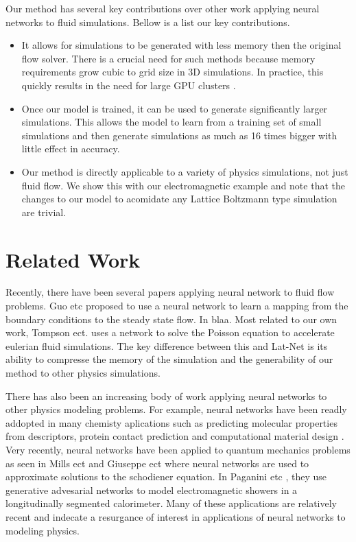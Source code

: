 \documentclass{article}
\begin{document}
Our method has several key contributions over other work applying neural networks to fluid simulations. Bellow is a list our key contributions.
\begin{itemize}
  \item It allows for simulations to be generated with less memory then the original flow solver. There is a crucial need for such methods because memory requirements grow cubic to grid size in 3D simulations. In practice, this quickly results in the need for large GPU clusters \cite{onodera2013large} \cite{xian2011multi}.
  \item Once our model is trained, it can be used to generate significantly larger simulations. This allows the model to learn from a training set of small simulations and then generate simulations as much as 16 times bigger with little effect in accuracy.
  \item Our method is directly applicable to a variety of physics simulations, not just fluid flow. We show this with our electromagnetic example and note that the changes to our model to acomidate any Lattice Boltzmann type simulation are trivial.
\end{itemize}

\section{Related Work}

Recently, there have been several papers applying neural network to fluid flow problems. Guo etc \cite{guo2016convolutional} proposed to use a neural network to learn a mapping from the boundary conditions to the steady state flow. In \cite{yang2016data} blaa. Most related to our own work, Tompson ect. \cite{tompson2016accelerating} uses a network to solve the Poisson equation to accelerate eulerian fluid simulations. The key difference between this and Lat-Net is its ability to compresse the memory of the simulation and the generability of our method to other physics simulations.

There has also been an increasing body of work applying neural networks to other physics modeling problems. For example, neural networks have been readly addopted in many chemisty aplications such as predicting molecular properties from descriptors, protein contact prediction and computational material design \cite{goh2017deep}. Very recently, neural networks have been applied to quantum mechanics problems as seen in Mills ect \cite{mills2017deep} and Giuseppe ect \cite{carleo2017solving} where neural networks are used to approximate solutions to the schodiener equation. In Paganini etc \cite{2017arXiv170502355P}, they use generative advesarial networks \cite{goodfellow2014generative} to model electromagnetic showers in a longitudinally segmented calorimeter. Many of these applications are relatively recent and indecate a resurgance of interest in applications of neural networks to modeling physics.
\end{document}
